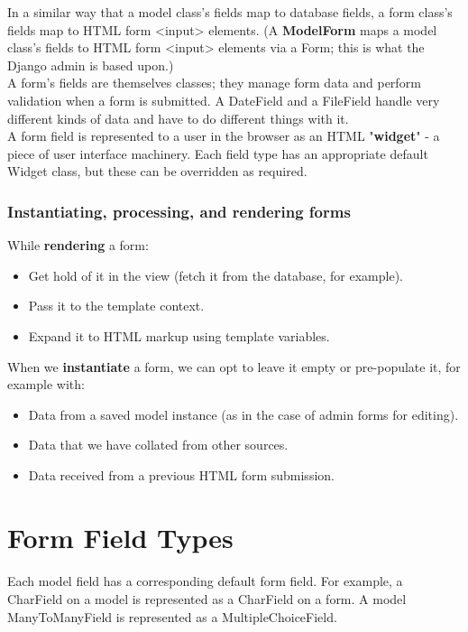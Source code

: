 In a similar way that a model class's fields map to database fields, a form class's fields map to HTML form <input> elements. (A \textbf{ModelForm} maps a model class's fields to HTML form <input> elements via a Form; this is what the Django admin is based upon.)\\

A form's fields are themselves classes; they manage form data and perform validation when a form is submitted. A DateField and a FileField handle very different kinds of data and have to do different things with it.\\

A form field is represented to a user in the browser as an HTML "\textbf{widget}" - a piece of user interface machinery. Each field type has an appropriate default Widget class, but these can be overridden as required.

\subsubsection{Instantiating, processing, and rendering forms}
While \textbf{rendering} a form:
\begin{itemize}
	\item Get hold of it in the view (fetch it from the database, for example).
	\item Pass it to the template context.
	\item Expand it to HTML markup using template variables.	
\end{itemize}
When we \textbf{instantiate} a form, we can opt to leave it empty or pre-populate it, for example with:
\begin{itemize}
	\item Data from a saved model instance (as in the case of admin forms for editing).
	\item Data that we have collated from other sources.
	\item Data received from a previous HTML form submission.	
\end{itemize}
\newpage
\section{Form Field Types}
\paragraph{}Each model field has a corresponding default form field. For example, a CharField on a model is represented as a CharField on a form. A model ManyToManyField is represented as a MultipleChoiceField.

